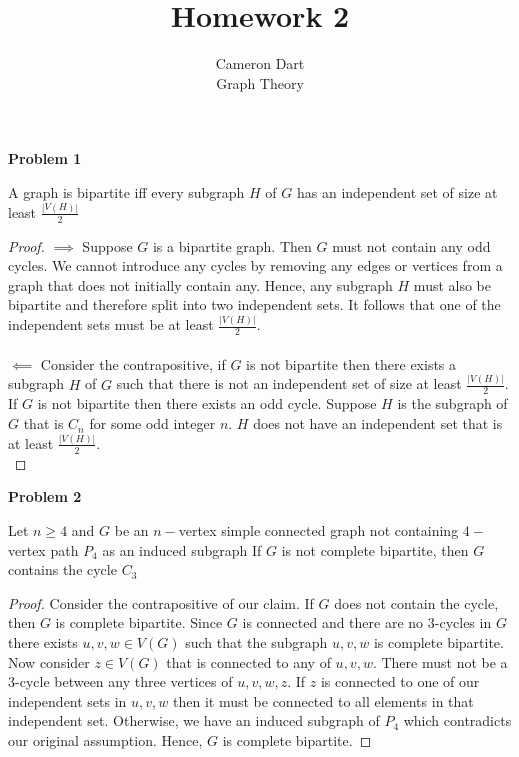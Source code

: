 \documentclass{article}
\newenvironment{claim}[2][Claim]{\begin{trivlist}
		\item[\hskip \labelsep {\bfseries #1}\hskip \labelsep {\bfseries #2}]}{\end{trivlist}}
\begin{document}
\title{Homework 2} %
\author{Cameron Dart\\ Graph Theory} %

\maketitle

\noindent\textbf{Problem 1}
\begin{claim}{}
	A graph is bipartite iff every subgraph $H$ of $G$ has an independent set of size at least $\frac{|V(H)|}{2}$
\end{claim}

\begin{proof}
	$\implies $ Suppose $G$ is a bipartite graph. Then $G$ must not contain any odd cycles. We cannot introduce any cycles by removing any edges or vertices from a graph that does not initially contain any. Hence, any subgraph $H$ must also be bipartite and therefore split into two independent sets. It follows that one of the independent sets must be at least $\frac{|V(H)|}{2}$.\\ \\
	$\impliedby$ Consider the contrapositive, if $G$ is not bipartite then there exists a subgraph $H$ of $G$ such that there is not an independent set of size at least $\frac{|V(H)|}{2}$. If $G$ is not bipartite then there exists an odd cycle. Suppose $H$ is the subgraph of $G$ that is $C_n$ for some odd integer $n$. $H$ does not have an independent set that is at least $\frac{|V(H)|}{2}$.\\
	\end{proof}

\noindent\textbf{Problem 2}
\begin{claim}{a}
	Let $n \geq 4$ and $G$ be an $n-$vertex simple connected graph not containing $4-$vertex path $P_4$ as an induced subgraph 
	If $G$ is not complete bipartite, then $G$ contains the cycle $C_3$
\end{claim}

\begin{proof}
	Consider the contrapositive of our claim. If $G$ does not contain the cycle, then $G$ is complete bipartite. Since $G$ is connected and there are no $3$-cycles in $G$ there exists $u,v,w \in V(G)$ such that the subgraph $u,v,w$ is complete bipartite. Now consider $z \in V(G)$ that is connected to any of $u,v,w$. There must not be a 3-cycle between any three vertices of $u,v,w,z$. If $z$ is connected to one of our independent sets in $u,v,w$ then it must be connected to all elements in that independent set. Otherwise, we have an induced subgraph of $P_4$ which contradicts our original assumption. Hence, $G$ is complete bipartite.
\end{proof}
\end{document}
